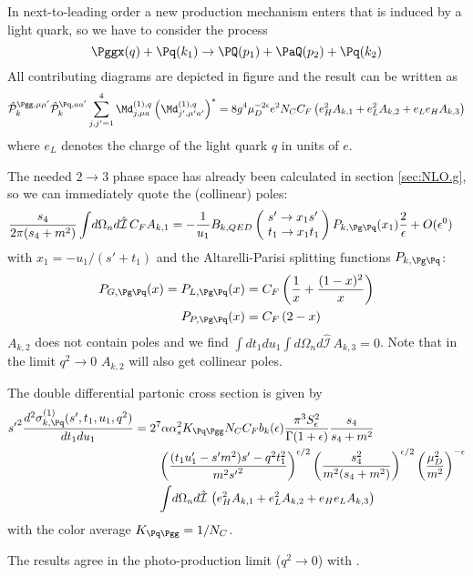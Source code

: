 In next-to-leading order a new production mechanism enters that is induced by a light quark, so we have to consider the process
\begin{equation}
\Pggx(q) + \Pq(k_1) \rightarrow \PQ(p_1)+\PaQ(p_2) + \Pq(k_2)
\end{equation}
All contributing diagrams are depicted in figure  and the result can be written as
\begin{equation}
\hat {\mathcal P}_{k}^{\Pgg,\mu\mu'}\hat {\mathcal P}_{k}^{\Pq,aa'}\sum_{j,j'=1}^4\Md^{(1),q}_{j,\mu a}\left(\Md^{(1),q}_{j',\mu' a'}\right)^* = 8g^4\mu_D^{-2\epsilon}e^2 N_C C_F\left( e_H^2 A_{k,1} +  e_L^2 A_{k,2} +  e_L e_H A_{k,3} \right)
\end{equation}
where $e_L$ denotes the charge of the light quark $q$ in units of $e$.

The needed $2\rightarrow 3$ phase space has already been calculated in section \ref{sec:NLO.g}, so we can immediately quote the (collinear) poles:
\begin{align}
\frac{s_4}{2\pi(s_4+m^2)}\int\!d\Omega_n d\hat{\mathcal I}\,C_F A_{k,1} &=-\frac 1 {u_1}B_{k,QED}\left(\!\begin{array}{l}s'\rightarrow x_1s'\\t_1\rightarrow x_1 t_1\end{array}\!\!\right) P_{k,\Pg\Pq}(x_1)\frac 2 \epsilon + O(\epsilon^0)
\end{align}
with $x_1 = -u_1/(s'+t_1)$ and the Altarelli-Parisi splitting functions $P_{k,\Pg\Pq}$\cite{Altarelli:1977zs,Vogelsang:1995vh}:
\begin{align}
P_{G,\Pg\Pq}(x) = P_{L,\Pg\Pq}(x) &= C_F\left(\frac 1 x + \frac {(1-x)^2} x\right) \label{eq:PGLgq} \\
P_{P,\Pg\Pq}(x) &= C_F\left(2-x\right) \label{eq:PPgq}
\end{align}
$A_{k,2}$ does not contain poles and we find $\int\!dt_1du_1\int\!d\Omega_n d\hat{\mathcal I}\,A_{k,3}=0$. Note that in the limit $q^2\rightarrow 0$ $A_{k,2}$ will also get collinear poles.


The double differential partonic cross section is given by
\begin{align}
{s'}^2\frac{d^2\sigma_{k,\Pq}^{(1)}(s',t_1,u_1,q^2)}{dt_1du_1} &= 2^7\alpha\alpha_s^2 K_{\Pq\Pgg}N_CC_Fb_k(\epsilon)\frac{\pi^3 S_\epsilon^2}{\Gamma(1+\epsilon)} \frac{s_4}{s_4+m^2}  \nonumber\\
 &\hspace{20pt} \left(\frac{(t_1u_1'-s'm^2)s' - q^2t_1^2}{m^2{s'}^2}\right)^{\epsilon/2} \left(\frac{s_4^2}{m^2(s_4+m^2)}\right)^{\epsilon/2} \left(\frac{\mu_D^2}{m^2}\right)^{-\epsilon} \nonumber\\
 &\hspace{20pt} \int\!d\Omega_n d\hat{\mathcal I}\,\left(e_H^2 A_{k,1} + e_L^2 A_{k,2} + e_H e_L A_{k,3} \right)
\end{align}
with the color average $K_{\Pq\Pgg} = 1/N_C$.

The results agree in the photo-production limit ($q^2\rightarrow 0$) with \cite{Bojak:1998zm}.
